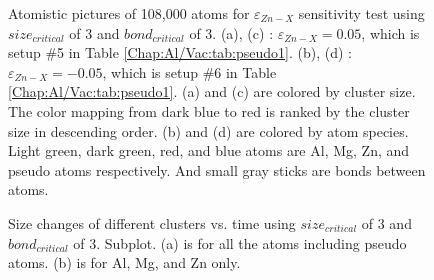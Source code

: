 \begin{figure}[!ht]
\caption[Atomistic pictures of 108,000 atoms for $\varepsilon_{Zn-X}$ sensitivity test.]{Atomistic pictures of 108,000 atoms for $\varepsilon_{Zn-X}$ sensitivity test using $size_{critical}$ of 3 and $bond_{critical}$ of 3. (a), (c) : $\varepsilon_{Zn-X} = 0.05$, which is setup \#5 in Table \ref{Chap:Al/Vac:tab:pseudo1}. (b), (d) : $\varepsilon_{Zn-X} = -0.05$, which is setup \#6 in Table \ref{Chap:Al/Vac:tab:pseudo1}. (a) and (c) are colored by cluster size. The color mapping from dark blue to red is ranked by the cluster size in descending order. (b) and (d) are colored by atom species. Light green, dark green, red, and blue atoms are Al, Mg, Zn, and pseudo atoms respectively. And small gray sticks are bonds between atoms.}
\label{Chap:Al/Vac:fig:sens_Zn}
\end{figure}
\endgroup



\newpage
\begingroup
\begin{figure}[!ht]
  \centering
\caption[Size changes of different clusters vs. time using $size_{critical}$ of 3 and $bond_{critical}$ of 3.]{Size changes of different clusters vs. time using $size_{critical}$ of 3 and $bond_{critical}$ of 3. Subplot. (a) is for all the atoms including pseudo atoms. (b) is for Al, Mg, and Zn only.}
\label{Chap:Al/Vac:fig:sens_cluster_size}
\end{figure}
\endgroup


